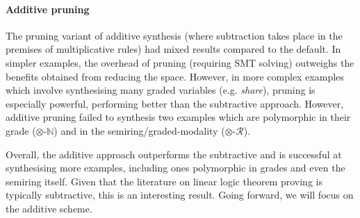 
\paragraph{Additive pruning}
The pruning variant of additive synthesis (where subtraction
takes place in the premises of multiplicative rules) had mixed results
compared to the default. In simpler examples, the overhead of pruning
(requiring SMT solving) outweighs
the benefits obtained from reducing the space. However, in more
complex examples which involve synthesising many graded variables (e.g. \textit{share}), pruning is
especially powerful, performing better than the subtractive
approach. However, additive pruning failed to synthesis two
 examples which are polymorphic in their grade
 ($\otimes$-$\mathbb{N}$) and in the semiring/graded-modality ($\otimes$-$\mathcal{R}$).


Overall, the additive approach outperforms the subtractive and is
successful at synthesising more examples, including ones polymorphic
in grades and even the semiring itself. Given that the literature on linear logic theorem proving
is typically subtractive, this is an interesting result. Going forward, we will focus on the additive
scheme. 